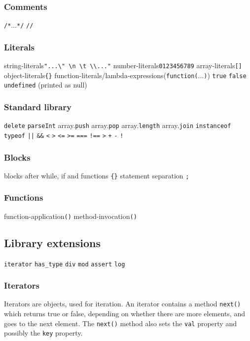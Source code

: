 \subsubsection{Comments}
\verb|/*|...\verb|*/|
\verb|//|
\subsubsection{Literals}
string-literals\verb|"...\" \n \t \\..."|
number-literals\verb|0123456789|
array-literals\verb|[]|
object-literals\verb|{}|
function-literals/lambda-expressions(\verb|function(|...\verb|)|)
\verb|true|
\verb|false|
\verb|undefined| (printed as null)

\subsubsection{Standard library}
\verb|delete|
\verb|parseInt|
array.\verb|push|
array.\verb|pop|
array.\verb|length|
array.\verb|join|
\verb|instanceof|
\verb|typeof|
\verb$||$ 
\verb|&&|
\verb|<|
\verb|>|
\verb|<=| 
\verb|>=|
\verb|===|
\verb|!==|
\verb|>|
\verb|+|
\verb|-|
\verb|!|

\subsubsection{Blocks}
blocks after while, if and functions \verb|{}|
statement separation \verb|;|

\subsubsection{Functions}
function-application\verb|()|
method-invocation\verb|()|


\subsection{Library extensions}
\verb|iterator|
\verb|has_type|
\verb|div|
\verb|mod|
\verb|assert|
\verb|log|
\subsubsection{Iterators}

Iterators are objects, used for iteration. An iterator contains a method \verb|next()| which returns true or false, depending on whether there are more elements, and goes to the next element. The \verb|next()| method also sets the \verb|val| property and possibly the \verb|key| property.

